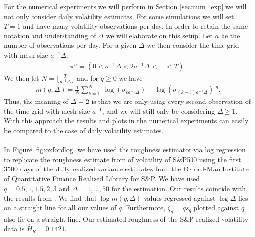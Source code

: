 \documentclass{article}
\begin{document}
For the numerical experiments we will perform in Section \ref{sec:num_exp} we will not only consider daily volatility estimates. For some simulations we will set $T=1$ and have many volatility observations per day. In order to retain the same notation and understanding of $\Delta$ we will elaborate on this setup. Let $a$ be the number of observations per day. For a given $\Delta$ we then consider the time grid with mesh size $a^{-1}\Delta$:
\begin{align*}
\pi^n = \left( 0 < a^{-1}\Delta< 2a^{-1}\Delta <...< T\right).
\end{align*}
We then let $N=\lfloor \frac{T}{a^{-1}\Delta} \rfloor$ and for $q\geq 0$ we have
\begin{align*}
m(q,\Delta) = \frac{1}{N} \sum_{k=1}^N \lvert \log(\sigma_{ka^{-1}\Delta})-\log(\sigma_{(k-1)a^{-1}\Delta})\rvert^q.
\end{align*}
Thus, the meaning of $\Delta = 2$ is that we are only using every second observation of the time grid with mesh size $a^{-1}$, and we will still only be considering $\Delta\geq 1$. With this approach the results and plots in the numerical experiments can easily be compared to the case of daily volatility estimates. \\\\
In Figure \ref{fig:oxfordlog} we have used the roughness estimator via log regression to replicate the roughness estimate from \cite{gatheral} of volatility of S\&P500 using the first 3500 days of the daily realized variance estimates from the Oxford-Man Institute of Quantitative Finance Realized Library for S\&P. We have used $q=0.5,1,1.5,2,3$ and $\Delta = 1,...,50$ for the estimation. Our results coincide with the results from \cite{gatheral}. We find that $\log m(q,\Delta)$ values regressed against $\log \Delta$ lies on a straight line for all our values of $q$. Furthermore, $\zeta_q=qs_q$ plotted against $q$ also lie on a straight line. Our estimated roughness of the S\&P realized volatility data is $\widehat{H}_R=0.1421$.
\end{document}
